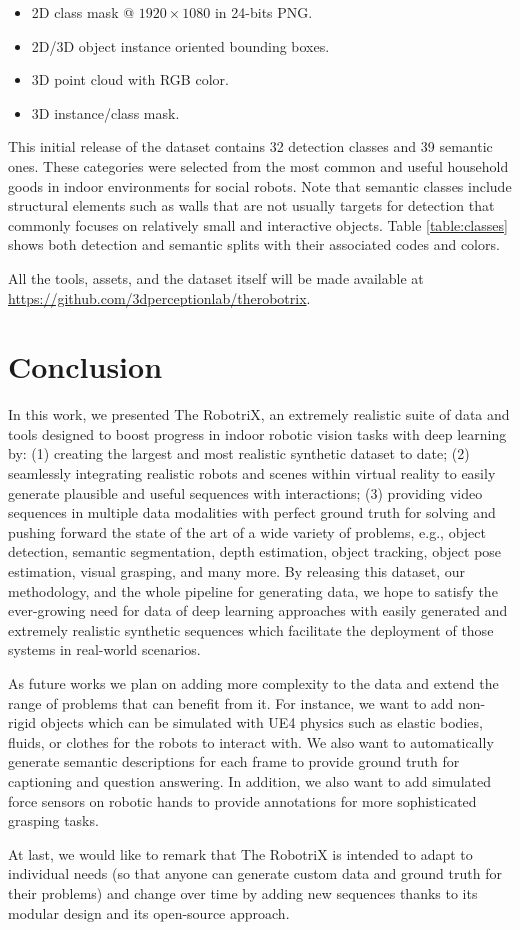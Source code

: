 \begin{itemize}
  \item 2D class mask @ $1920\times1080$ in 24-bits PNG.
  \item 2D/3D object instance oriented bounding boxes.
  \item 3D point cloud with RGB color.
  \item 3D instance/class mask.
\end{itemize}

This initial release of the dataset contains 32 detection classes and 39 semantic ones. These categories were selected from the most common and useful household goods in indoor environments for social robots. Note that semantic classes include structural elements such as walls that are not usually targets for detection that commonly focuses on relatively small and interactive objects. Table \ref{table:classes} shows both detection and semantic splits with their associated codes and colors.

All the tools, assets, and the dataset itself will be made available at \url{https://github.com/3dperceptionlab/therobotrix}.

\section{Conclusion}
\label{cha:sim2real:sec:conclusion}

In this work, we presented The RobotriX, an extremely realistic suite of data and tools designed to boost progress in indoor robotic vision tasks with deep learning by: (1) creating the largest and most realistic synthetic dataset to date; (2) seamlessly integrating realistic robots and scenes within virtual reality to easily generate plausible and useful sequences with interactions; (3) providing video sequences in multiple data modalities with perfect ground truth for solving and pushing forward the state of the art of a wide variety of problems, e.g., object detection, semantic segmentation, depth estimation, object tracking, object pose estimation, visual grasping, and many more. By releasing this dataset, our methodology, and the whole pipeline for generating data, we hope to satisfy the ever-growing need for data of deep learning approaches with easily generated and extremely realistic synthetic sequences which facilitate the deployment of those systems in real-world scenarios. 

As future works we plan on adding more complexity to the data and extend the range of problems that can benefit from it. For instance, we want to add non-rigid objects which can be simulated with \acl{UE4} physics such as elastic bodies, fluids, or clothes for the robots to interact with. We also want to automatically generate semantic descriptions for each frame to provide ground truth for captioning and question answering. In addition, we also want to add simulated force sensors on robotic hands to provide annotations for more sophisticated grasping tasks.

At last, we would like to remark that The RobotriX is intended to adapt to individual needs (so that anyone can generate custom data and ground truth for their problems) and change over time by adding new sequences thanks to its modular design and its open-source approach.